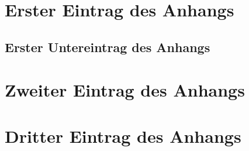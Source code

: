 \section{Erster Eintrag des Anhangs}

\subsection{Erster Untereintrag des Anhangs}

\section{Zweiter Eintrag des Anhangs}

\section{Dritter Eintrag des Anhangs} 
